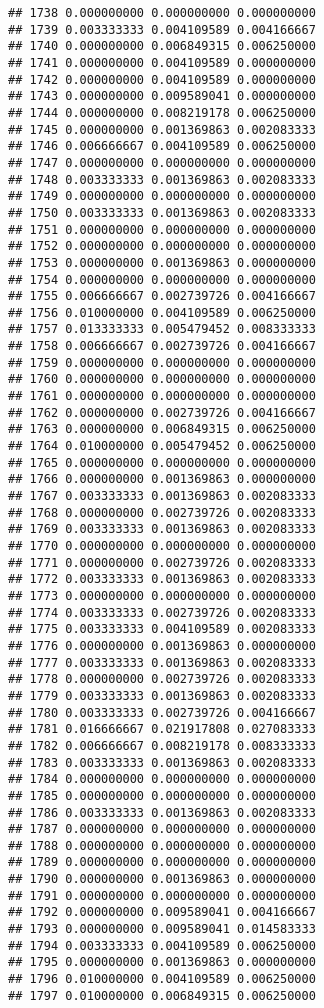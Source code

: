 \documentclass[
]{article}
\begin{document}
\begin{verbatim}
## 1738 0.000000000 0.000000000 0.000000000
## 1739 0.003333333 0.004109589 0.004166667
## 1740 0.000000000 0.006849315 0.006250000
## 1741 0.000000000 0.004109589 0.000000000
## 1742 0.000000000 0.004109589 0.000000000
## 1743 0.000000000 0.009589041 0.000000000
## 1744 0.000000000 0.008219178 0.006250000
## 1745 0.000000000 0.001369863 0.002083333
## 1746 0.006666667 0.004109589 0.006250000
## 1747 0.000000000 0.000000000 0.000000000
## 1748 0.003333333 0.001369863 0.002083333
## 1749 0.000000000 0.000000000 0.000000000
## 1750 0.003333333 0.001369863 0.002083333
## 1751 0.000000000 0.000000000 0.000000000
## 1752 0.000000000 0.000000000 0.000000000
## 1753 0.000000000 0.001369863 0.000000000
## 1754 0.000000000 0.000000000 0.000000000
## 1755 0.006666667 0.002739726 0.004166667
## 1756 0.010000000 0.004109589 0.006250000
## 1757 0.013333333 0.005479452 0.008333333
## 1758 0.006666667 0.002739726 0.004166667
## 1759 0.000000000 0.000000000 0.000000000
## 1760 0.000000000 0.000000000 0.000000000
## 1761 0.000000000 0.000000000 0.000000000
## 1762 0.000000000 0.002739726 0.004166667
## 1763 0.000000000 0.006849315 0.006250000
## 1764 0.010000000 0.005479452 0.006250000
## 1765 0.000000000 0.000000000 0.000000000
## 1766 0.000000000 0.001369863 0.000000000
## 1767 0.003333333 0.001369863 0.002083333
## 1768 0.000000000 0.002739726 0.002083333
## 1769 0.003333333 0.001369863 0.002083333
## 1770 0.000000000 0.000000000 0.000000000
## 1771 0.000000000 0.002739726 0.002083333
## 1772 0.003333333 0.001369863 0.002083333
## 1773 0.000000000 0.000000000 0.000000000
## 1774 0.003333333 0.002739726 0.002083333
## 1775 0.003333333 0.004109589 0.002083333
## 1776 0.000000000 0.001369863 0.000000000
## 1777 0.003333333 0.001369863 0.002083333
## 1778 0.000000000 0.002739726 0.002083333
## 1779 0.003333333 0.001369863 0.002083333
## 1780 0.003333333 0.002739726 0.004166667
## 1781 0.016666667 0.021917808 0.027083333
## 1782 0.006666667 0.008219178 0.008333333
## 1783 0.003333333 0.001369863 0.002083333
## 1784 0.000000000 0.000000000 0.000000000
## 1785 0.000000000 0.000000000 0.000000000
## 1786 0.003333333 0.001369863 0.002083333
## 1787 0.000000000 0.000000000 0.000000000
## 1788 0.000000000 0.000000000 0.000000000
## 1789 0.000000000 0.000000000 0.000000000
## 1790 0.000000000 0.001369863 0.000000000
## 1791 0.000000000 0.000000000 0.000000000
## 1792 0.000000000 0.009589041 0.004166667
## 1793 0.000000000 0.009589041 0.014583333
## 1794 0.003333333 0.004109589 0.006250000
## 1795 0.000000000 0.001369863 0.000000000
## 1796 0.010000000 0.004109589 0.006250000
## 1797 0.010000000 0.006849315 0.006250000

\end{verbatim}
\end{document}
